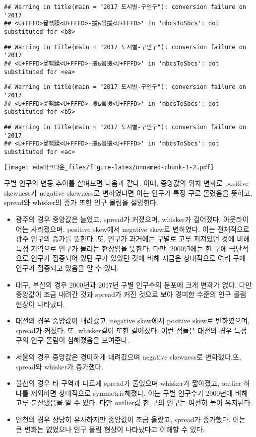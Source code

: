 \documentclass[]{article}
\begin{document}
\begin{verbatim}
## Warning in title(main = "2017 도시별-구인구"): conversion failure on '2017
## <U+FFFD>꾩떆蹂<U+FFFD>-援ъ씤援<U+FFFD>' in 'mbcsToSbcs': dot substituted for <b8>
\end{verbatim}

\begin{verbatim}
## Warning in title(main = "2017 도시별-구인구"): conversion failure on '2017
## <U+FFFD>꾩떆蹂<U+FFFD>-援ъ씤援<U+FFFD>' in 'mbcsToSbcs': dot substituted for <ea>
\end{verbatim}

\begin{verbatim}
## Warning in title(main = "2017 도시별-구인구"): conversion failure on '2017
## <U+FFFD>꾩떆蹂<U+FFFD>-援ъ씤援<U+FFFD>' in 'mbcsToSbcs': dot substituted for <b5>
\end{verbatim}

\begin{verbatim}
## Warning in title(main = "2017 도시별-구인구"): conversion failure on '2017
## <U+FFFD>꾩떆蹂<U+FFFD>-援ъ씤援<U+FFFD>' in 'mbcsToSbcs': dot substituted for <ac>
\end{verbatim}

\texttt{[image: eda마크다운\_files/figure-latex/unnamed-chunk-1-2.pdf]}

구별 인구의 변동 추이를 살펴보면 다음과 같다. 이때, 중앙값의 위치 변화로
positive skewness가 negative skewness로 변하였다면 이는 인구가 특정 구로
몰렸음을 뜻하고, spread와 whisker의 증가 또한 인구 몰림을 설명한다.

\begin{itemize}
\item
  광주의 경우 중앙값은 늘었고, spread가 커졌으며, whisker가 길어졌다.
  아웃라이어는 사라졌으며, positive skew에서 negative skew로 변하였다.
  이는 전체적으로 광주 인구의 증가를 뜻한다. 또, 인구가 과거에는 구별로
  고루 퍼져있던 것에 비해 특정 지역으로 인구가 몰리는 현상임을 뜻한다.
  다만, 2000년에는 한 구에 극단적으로 인구가 집중되어 있던 구가 있었던
  것에 비해 지금은 상대적으로 여러 구에 인구가 집중되고 있음을 알 수
  있다.
\item
  대구, 부산의 경우 2000년과 2017년 구별 인구수의 분포에 크게 변화가
  없다. 다만 중앙값이 조금 내려간 것과 spread가 커진 것으로 보아 경미한
  수준의 인구 몰림 현상이 나타났다.
\item
  대전의 경우 중앙값이 내려갔고, negative skew에서 positive skew로
  변하였으며, spread가 커졌다. 또, whisker길이 또한 길어졌다. 이런
  점들은 대전의 경우 특정 구의 인구 몰림이 심해졌음을 보여준다.
\item
  서울의 경우 중앙값은 경미하게 내려갔으며 negative skewness로
  변화했다.또, spread와 whisker가 증가했다.
\item
  울산의 경우 타 구역과 다르게 spread가 줄었으며 whisker가 짧아졌고,
  outlier 하나를 제외하면 상대적으로 symmetric해졌다. 이는 구별 인구수가
  2000년에 비해 고루 분산됐음을 알 수 있다. 다만 outlier값 한 구의
  인구는 여전히 높이 유지된다.
\item
  인천의 경우 상당히 유사하지만 중앙값이 조금 올랐고, spread가 증가했다.
  이는 큰 변화는 없었으나 인구 몰림 현상이 나타났다고 이해할 수 있다.
\end{itemize}
\end{document}
